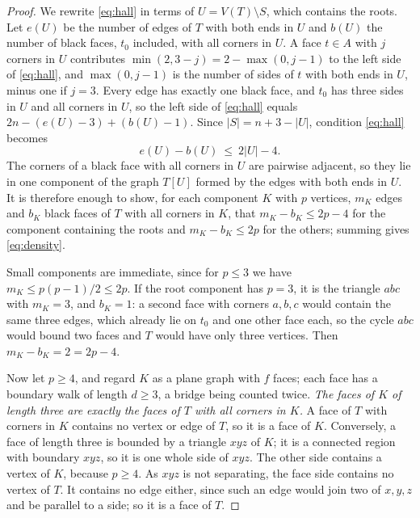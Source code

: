 \documentclass[10pt]{amsart}
\numberwithin{equation}{section}
\theoremstyle{definition}
\theoremstyle{remark}
\newcommand{\T}{T}
\begin{document}
\begin{proof}
We rewrite \eqref{eq:hall} in terms of $U=V(\T)\setminus S$, which contains the roots.
Let $e(U)$ be the number of edges of $\T$ with both ends in $U$ and $b(U)$ the number of black faces, $t_0$ included, with all corners in $U$.
A face $t\in A$ with $j$ corners in $U$ contributes $\min(2,3-j)=2-\max(0,j-1)$ to the left side of \eqref{eq:hall}, and $\max(0,j-1)$ is the number of sides of $t$ with both ends in $U$, minus one if $j=3$.
Every edge has exactly one black face, and $t_0$ has three sides in $U$ and all corners in $U$, so the left side of \eqref{eq:hall} equals $2n-(e(U)-3)+(b(U)-1)$.
Since $|S|=n+3-|U|$, condition \eqref{eq:hall} becomes
\begin{equation}\label{eq:density}
e(U)-b(U)\ \le\ 2|U|-4 .
\end{equation}
The corners of a black face with all corners in $U$ are pairwise adjacent, so they lie in one component of the graph $\T[U]$ formed by the edges with both ends in $U$.
It is therefore enough to show, for each component $K$ with $p$ vertices, $m_K$ edges and $b_K$ black faces of $\T$ with all corners in $K$, that $m_K-b_K\le 2p-4$ for the component containing the roots and $m_K-b_K\le 2p$ for the others; summing gives \eqref{eq:density}.

Small components are immediate, since for $p\le3$ we have $m_K\le p(p-1)/2\le 2p$.
If the root component has $p=3$, it is the triangle $abc$ with $m_K=3$, and $b_K=1$: a second face with corners $a,b,c$ would contain the same three edges, which already lie on $t_0$ and one other face each, so the cycle $abc$ would bound two faces and $\T$ would have only three vertices.
Then $m_K-b_K=2=2p-4$.

Now let $p\ge4$, and regard $K$ as a plane graph with $f$ faces; each face has a boundary walk of length $d\ge3$, a bridge being counted twice.
\emph{The faces of $K$ of length three are exactly the faces of $\T$ with all corners in $K$.}
A face of $\T$ with corners in $K$ contains no vertex or edge of $\T$, so it is a face of $K$.
Conversely, a face of length three is bounded by a triangle $xyz$ of $K$; it is a connected region with boundary $xyz$, so it is one whole side of $xyz$.
The other side contains a vertex of $K$, because $p\ge4$.
As $xyz$ is not separating, the face side contains no vertex of $\T$.
It contains no edge either, since such an edge would join two of $x,y,z$ and be parallel to a side; so it is a face of $\T$.


\end{proof}
\end{document}
